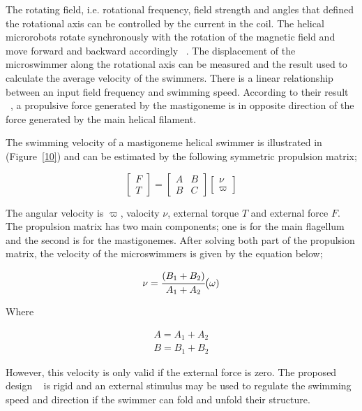 \documentclass[a4paper,11pt]{article}
\begin{document}
\begin{sloppypar}
 The rotating field, i.e. rotational frequency, field strength and angles that 
defined the rotational axis can be controlled by the current in the coil. The helical microrobots rotate 
synchronously with the rotation of the magnetic field and move forward and backward accordingly ~\citep{tottori2013artificial}. 
The displacement of the microswimmer along the rotational axis can be measured and the result 
used to calculate the average velocity of the swimmers. There is a linear relationship between an input 
field frequency and swimming speed. According to their result ~\citep{tottori2013artificial}, a propulsive force generated by 
the mastigoneme is in opposite direction of the force generated by the main helical filament. 



The swimming velocity of a mastigoneme helical swimmer is illustrated in  (Figure~\ref{10}) and can be estimated by the following
 symmetric propulsion matrix;


\[
\begin{bmatrix} F\\ 
T \end{bmatrix}  =\begin{bmatrix} A & B \\ 
B & C \end{bmatrix}  \begin{bmatrix} \nu
 \\ \varpi
\end{bmatrix}
\]

The angular velocity is $\varpi$, valocity $\nu$, external torque $T$ and external force $F$.
The propulsion matrix has two main components; one is for the main flagellum and the second is for the mastigonemes. 
After solving both part of the propulsion matrix,
 the velocity of the microswimmers is given by the equation below;


\begin{equation}
  \nu = {\cfrac{(B_1 + B_2)}{A_1+A_2}} \big( \omega)
\end{equation} 

Where

\begin{equation}
\begin{split}
  A = A_1+A_2 \\
 B= B_1+B_2
\end{split}
\end{equation} 

However, this velocity is only valid if the external force is zero. The proposed 
design ~\citep{tottori2013artificial} is rigid and an external stimulus may be used to regulate the swimming
 speed and direction if the swimmer can fold and unfold their structure. 




\end{sloppypar}
\end{document}
